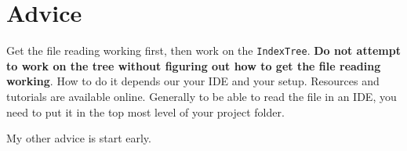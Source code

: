 \documentclass[10pt,letterpaper]{article}
\begin{document}
	\section{Advice}
	
	
	Get the file reading working first, then work on the \texttt{IndexTree}.
	\textbf{Do not attempt to work on the tree without figuring out how to get the file reading working}. 
	How to do it depends our your IDE and your setup.
	Resources and tutorials are available online.
	Generally to be able to read the file in an IDE, you need to put it in the top most level of your project folder.
	
	My other advice is start early.

	
\end{document}
